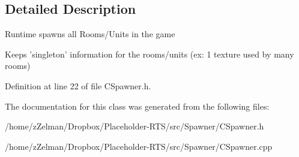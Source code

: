 \subsection{Detailed Description}
Runtime spawns all Rooms/\-Units in the game

Keeps 'singleton' information for the rooms/units (ex\-: 1 texture used by many rooms) 

Definition at line 22 of file C\-Spawner.\-h.



The documentation for this class was generated from the following files\-:\begin{DoxyCompactItemize}
\item 
/home/z\-Zelman/\-Dropbox/\-Placeholder-\/\-R\-T\-S/src/\-Spawner/C\-Spawner.\-h\item 
/home/z\-Zelman/\-Dropbox/\-Placeholder-\/\-R\-T\-S/src/\-Spawner/C\-Spawner.\-cpp\end{DoxyCompactItemize}
